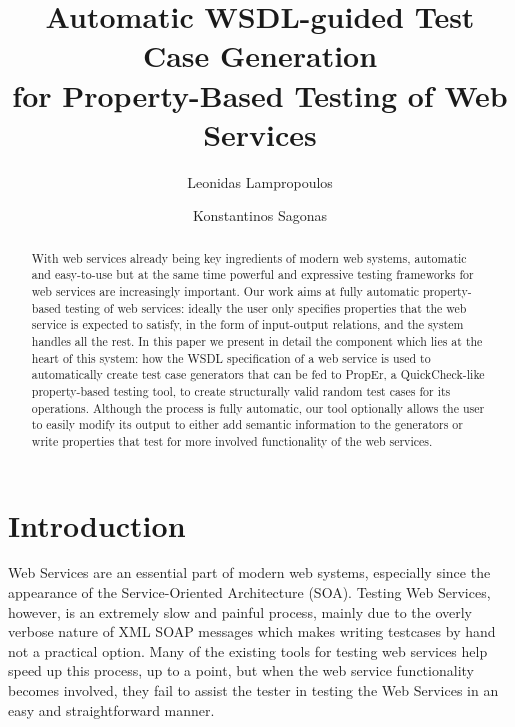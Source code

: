 \documentclass[submission,copyright,a4]{eptcs}
\title{Automatic WSDL-guided Test Case Generation\\
       for Property-Based Testing of Web Services}
\author{Leonidas Lampropoulos \and Konstantinos Sagonas}
\begin{document}
\maketitle

\begin{abstract}
With web services already being key ingredients of modern web systems,
automatic and easy-to-use but at the same time powerful and expressive
testing frameworks for web services are increasingly important. Our
work aims at fully automatic property-based testing of web services:
ideally the user only specifies properties that the web service is
expected to satisfy, in the form of input-output relations, and the
system handles all the rest. In this paper we present in detail the
component which lies at the heart of this system: how the WSDL
specification of a web service is used to automatically create test
case generators that can be fed to PropEr, a QuickCheck-like
property-based testing tool, to create structurally valid random
test cases for its operations. Although the process is fully automatic,
our tool optionally allows the user to easily modify its output to
either add semantic information to the generators or write properties
that test for more involved functionality of the web services.
\end{abstract}


\section{Introduction}


Web Services are an essential part of modern web systems, especially
since the appearance of the Service-Oriented Architecture (SOA).
Testing Web Services, however, is an extremely slow and painful
process, mainly due to the overly verbose nature of XML SOAP messages
which makes writing testcases by hand not a practical option. Many of
the existing tools for testing web services help speed up this
process, up to a point, but when the web service functionality becomes
involved, they fail to assist the tester in testing the Web Services
in an easy and straightforward manner.

\end{document}
